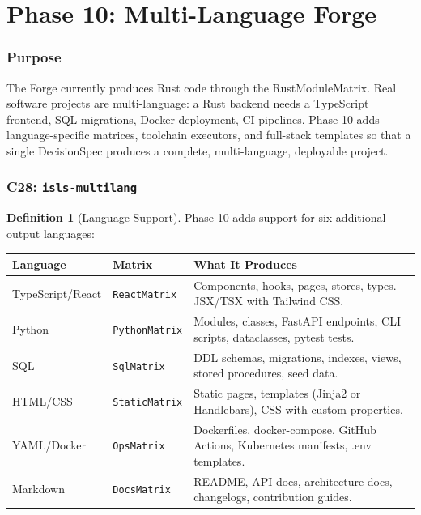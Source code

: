 \documentclass[11pt,a4paper,twoside]{article}
\theoremstyle{definition}
\newtheorem{definition}{Definition}[section]
\theoremstyle{plain}
\theoremstyle{remark}
\begin{document}
\tableofcontents
\newpage


\part{Phase 10: Multi-Language Forge}\label{part:multilang}

\section{Purpose}\label{sec:ml:purpose}

The Forge currently produces Rust code through the RustModuleMatrix.
Real software projects are multi-language: a Rust backend needs a
TypeScript frontend, SQL migrations, Docker deployment, CI pipelines.
Phase 10 adds language-specific matrices, toolchain executors, and
full-stack templates so that a single DecisionSpec produces a
complete, multi-language, deployable project.


\section{C28: \texttt{isls-multilang}}\label{sec:ml:crate}

\begin{definition}[Language Support]\label{def:langs}
Phase 10 adds support for six additional output languages:

\begin{tabularx}{\textwidth}{l l X}
\toprule
\textbf{Language} & \textbf{Matrix} & \textbf{What It Produces} \\
\midrule
TypeScript/React & \texttt{ReactMatrix} & Components, hooks, pages,
  stores, types. JSX/TSX with Tailwind CSS. \\
Python & \texttt{PythonMatrix} & Modules, classes, FastAPI endpoints,
  CLI scripts, dataclasses, pytest tests. \\
SQL & \texttt{SqlMatrix} & DDL schemas, migrations, indexes, views,
  stored procedures, seed data. \\
HTML/CSS & \texttt{StaticMatrix} & Static pages, templates (Jinja2 or
  Handlebars), CSS with custom properties. \\
YAML/Docker & \texttt{OpsMatrix} & Dockerfiles, docker-compose,
  GitHub Actions, Kubernetes manifests, .env templates. \\
Markdown & \texttt{DocsMatrix} & README, API docs, architecture
  docs, changelogs, contribution guides. \\
\bottomrule
\end{tabularx}
\end{definition}
\end{document}
